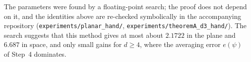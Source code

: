 \begin{remark}
The parameters were found by a floating-point search; the proof does not depend on it, and the
identities above are re-checked symbolically in the accompanying repository
(\nolinkurl{experiments/planar_hand/}, \nolinkurl{experiments/theoremA_d3_hand/}). The search suggests that
this method gives at most about $2.1722$ in the plane and $6.687$ in space, and only small gains for
$d \ge 4$, where the averaging error $e(\psi)$ of Step~4 dominates.
\end{remark}

